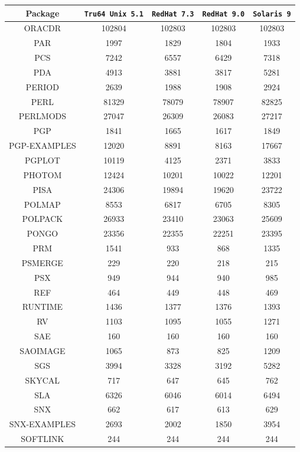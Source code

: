\documentclass[twoside,11pt]{article}
\renewcommand{\_}{\texttt{\symbol{95}}}
\begin{document}
\begin{table}[p]
\begin{center}
\begin{tabular}{|c|c|c|c|c|}
\hline \hline
\textbf{Package} & \texttt{Tru64 Unix 5.1} & \texttt{RedHat 7.3} & \texttt{RedHat 9.0} & \texttt{Solaris 9} \\ \hline \hline
\hline
ORACDR & 102804 & 102803 & 102803 & 102803 \\
PAR & 1997 & 1829 & 1804 & 1933 \\
PCS & 7242 & 6557 & 6429 & 7318 \\
PDA & 4913 & 3881 & 3817 & 5281 \\
PERIOD & 2639 & 1988 & 1908 & 2924 \\
PERL & 81329 & 78079 & 78907 & 82825 \\
PERLMODS & 27047 & 26309 & 26083 & 27217 \\
PGP & 1841 & 1665 & 1617 & 1849 \\
PGP-EXAMPLES & 12020 & 8891 & 8163 & 17667 \\
PGPLOT & 10119 & 4125 & 2371 & 3833 \\
PHOTOM & 12424 & 10201 & 10022 & 12201 \\
PISA & 24306 & 19894 & 19620 & 23722 \\
POLMAP & 8553 & 6817 & 6705 & 8305 \\
POLPACK & 26933 & 23410 & 23063 & 25609 \\
PONGO & 23356 & 22355 & 22251 & 23395 \\
PRM & 1541 & 933 & 868 & 1335 \\
PSMERGE & 229 & 220 & 218 & 215 \\
PSX & 949 & 944 & 940 & 985 \\
REF & 464 & 449 & 448 & 469 \\
RUNTIME & 1436 & 1377 & 1376 & 1393 \\
RV & 1103 & 1095 & 1055 & 1271 \\
SAE & 160 & 160 & 160 & 160 \\
SAOIMAGE & 1065 & 873 & 825 & 1209 \\
SGS & 3994 & 3328 & 3192 & 5282 \\
SKYCAL & 717 & 647 & 645 & 762 \\
SLA & 6326 & 6046 & 6014 & 6494 \\
SNX & 662 & 617 & 613 & 629 \\
SNX-EXAMPLES & 2693 & 2002 & 1850 & 3954 \\
SOFTLINK & 244 & 244 & 244 & 244 \\

\end{tabular}
\end{center}
\end{table}
\end{document}
